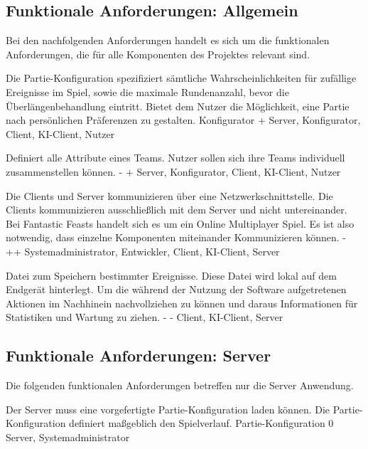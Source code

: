 \subsection{Funktionale Anforderungen: Allgemein}

Bei den nachfolgenden Anforderungen handelt es sich um die funktionalen Anforderungen, die für alle Komponenten des Projektes relevant sind.

        {Die Partie-Konfiguration spezifiziert sämtliche Wahrscheinlichkeiten für zufällige Ereignisse im Spiel, sowie die maximale Rundenanzahl, bevor die Überlängenbehandlung eintritt.}
        {Bietet dem Nutzer die Möglichkeit, eine Partie nach persönlichen Präferenzen zu gestalten.}
        {Konfigurator}
        {+}
        {Server, Konfigurator, Client, KI-Client, Nutzer}

        {Definiert alle Attribute eines Teams.}
        {Nutzer sollen sich ihre Teams individuell zusammenstellen können.}
        {-}
        {+}
        {Server, Konfigurator, Client, KI-Client, Nutzer}	
        
        {Die Clients und Server kommunizieren über eine Netzwerkschnittstelle. Die Clients kommunizieren ausschließlich mit dem Server und nicht untereinander.}
        {Bei \glqq{}Fantastic Feasts\grqq{} handelt sich es um ein Online Multiplayer Spiel. Es ist also notwendig, dass einzelne Komponenten miteinander Kommunizieren können.}
        {-}
        {++}
        {Systemadministrator, Entwickler, Client, KI-Client, Server}

        {Datei zum Speichern bestimmter Ereignisse. Diese Datei wird lokal auf dem Endgerät hinterlegt.}
        {Um die während der Nutzung der Software aufgetretenen Aktionen im Nachhinein nachvollziehen zu können und daraus Informationen für Statistiken und Wartung zu ziehen.}
        {-}
        {-}
        {Client, KI-Client, Server}
        

\subsection{Funktionale Anforderungen: Server}

Die folgenden funktionalen Anforderungen betreffen nur die Server Anwendung.
        
        {Der Server muss eine vorgefertigte Partie-Konfiguration laden können.}
        {Die Partie-Konfiguration definiert maßgeblich den Spielverlauf.}
        {Partie-Konfiguration}
        {0}
        {Server, Systemadministrator}

